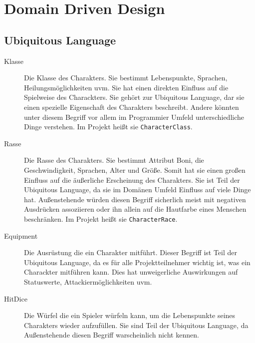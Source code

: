 \chapter{Domain Driven Design}
\section{Ubiquitous Language}
\begin{description}
	\item[Klasse] Die Klasse des Charakters. Sie bestimmt Lebenspunkte, Sprachen, Heilungsmöglichkeiten uvm. Sie hat einen direkten Einfluss auf die Spielweise des Charackters. Sie gehört zur Ubiquitous Language, dar sie einen spezielle Eigenschaft des Charakters beschreibt. Andere könnten unter diesem Begriff vor allem im Programmier Umfeld unterschiedliche Dinge verstehen. Im Projekt heißt sie \texttt{CharacterClass}.
	\item[Rasse] Die Rasse des Charakters. Sie bestimmt Attribut Boni, die Geschwindigkeit, Sprachen, Alter und Größe. Somit hat sie einen großen Einfluss auf die äußerliche Erscheinung des Charakters. Sie ist Teil der Ubiquitous Language, da sie im Domänen Umfeld Einfluss auf viele Dinge hat. Außenstehende würden diesen Begriff sicherlich meist mit negativen Ausdrücken assoziieren oder ihn allein auf die Hautfarbe eines Menschen beschränken. Im Projekt heißt sie \texttt{CharacterRace}.
	\item[Equipment] Die Ausrüstung die ein Charakter mitführt. Dieser Begriff ist Teil der Ubiquitous 
	Language, da es für alle Projektteilnehmer wichtig ist, was ein Charackter mitführen kann. Dies hat unweigerliche Auswirkungen auf Statuswerte, Attackiermöglichkeiten uvm.
	\item[HitDice] Die Würfel die ein Spieler würfeln kann, um die Lebenspunkte seines Charakters wieder aufzufüllen. Sie sind Teil der Ubiquitous Language, da Außenstehende diesen Begriff warscheinlich nicht kennen.
\end{description}

\FloatBarrier
